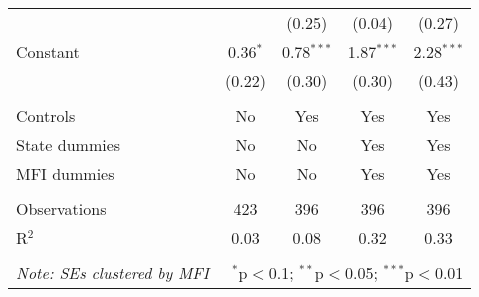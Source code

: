 \documentclass[11pt]{article}
\begin{document}
\begin{table}[!htbp]
\begin{tabular}{@{\extracolsep{5pt}}lcccc}
  &  & (0.25) & (0.04) & (0.27) \\ 
  Constant & 0.36$^{*}$ & 0.78$^{***}$ & 1.87$^{***}$ & 2.28$^{***}$ \\ 
  & (0.22) & (0.30) & (0.30) & (0.43) \\ 
 \hline \\[-1.8ex] 
Controls & No & Yes & Yes & Yes \\ 
State dummies & No & No & Yes & Yes \\ 
MFI dummies & No & No & Yes & Yes \\ 
\hline \\[-1.8ex] 
Observations & 423 & 396 & 396 & 396 \\ 
R$^{2}$ & 0.03 & 0.08 & 0.32 & 0.33 \\ 
\hline 
\hline \\[-1.8ex] 
\textit{Note: SEs clustered by MFI}  & \multicolumn{4}{r}{$^{*}$p$<$0.1; $^{**}$p$<$0.05; $^{***}$p$<$0.01} \\ 
\end{tabular} 
\end{table} 
\end{document}
